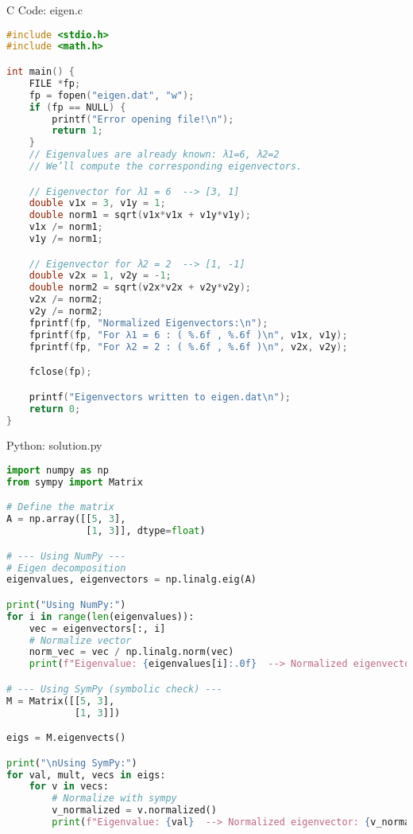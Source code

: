\documentclass{beamer}
\numberwithin{equation}{section}
\theoremstyle{remark}
\begin{document}
\begin{frame}[fragile]{C Code: eigen.c}
\begin{lstlisting}[language=C]
#include <stdio.h>
#include <math.h>

int main() {
    FILE *fp;
    fp = fopen("eigen.dat", "w");
    if (fp == NULL) {
        printf("Error opening file!\n");
        return 1;
    }
    // Eigenvalues are already known: λ1=6, λ2=2
    // We’ll compute the corresponding eigenvectors.

    // Eigenvector for λ1 = 6  --> [3, 1]
    double v1x = 3, v1y = 1;
    double norm1 = sqrt(v1x*v1x + v1y*v1y);
    v1x /= norm1;
    v1y /= norm1;

    // Eigenvector for λ2 = 2  --> [1, -1]
    double v2x = 1, v2y = -1;
    double norm2 = sqrt(v2x*v2x + v2y*v2y);
    v2x /= norm2;
    v2y /= norm2;
    fprintf(fp, "Normalized Eigenvectors:\n");
    fprintf(fp, "For λ1 = 6 : ( %.6f , %.6f )\n", v1x, v1y);
    fprintf(fp, "For λ2 = 2 : ( %.6f , %.6f )\n", v2x, v2y);

    fclose(fp);

    printf("Eigenvectors written to eigen.dat\n");
    return 0;
}


\end{lstlisting}
\end{frame}

\begin{frame}[fragile]{Python: solution.py}
\begin{lstlisting}[language=Python]
import numpy as np
from sympy import Matrix

# Define the matrix
A = np.array([[5, 3],
              [1, 3]], dtype=float)

# --- Using NumPy ---
# Eigen decomposition
eigenvalues, eigenvectors = np.linalg.eig(A)

print("Using NumPy:")
for i in range(len(eigenvalues)):
    vec = eigenvectors[:, i]
    # Normalize vector
    norm_vec = vec / np.linalg.norm(vec)
    print(f"Eigenvalue: {eigenvalues[i]:.0f}  --> Normalized eigenvector: {norm_vec}")

# --- Using SymPy (symbolic check) ---
M = Matrix([[5, 3],
            [1, 3]])

eigs = M.eigenvects()

print("\nUsing SymPy:")
for val, mult, vecs in eigs:
    for v in vecs:
        # Normalize with sympy
        v_normalized = v.normalized()
        print(f"Eigenvalue: {val}  --> Normalized eigenvector: {v_normalized}")


\end{lstlisting}
\end{frame}
\end{document}
